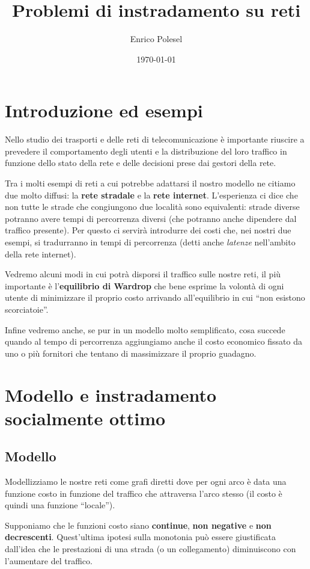 \documentclass[a4paper]{article}
\title{Problemi di instradamento su reti}
\date{\today}
\author{Enrico Polesel}
\theoremstyle{plain}
\theoremstyle{definition}
\theoremstyle{remark}
\begin{document}
\maketitle

\section{Introduzione ed esempi}

Nello studio dei trasporti e delle reti di telecomunicazione è
importante riuscire a prevedere il comportamento degli utenti e la
distribuzione del loro traffico in funzione dello stato della rete e
delle decisioni prese dai gestori della rete.

Tra i molti esempi di reti a cui potrebbe adattarsi il nostro modello
ne citiamo due molto diffusi: la \textbf{rete stradale} e la
\textbf{rete internet}. L'esperienza ci dice che non tutte le strade
che congiungono due località sono equivalenti: strade diverse potranno
avere tempi di percorrenza diversi (che potranno anche dipendere dal
traffico presente). Per questo ci servirà introdurre dei costi che,
nei nostri due esempi, si tradurranno in tempi di percorrenza (detti
anche \textit{latenze} nell'ambito della rete internet).

Vedremo alcuni modi in cui potrà disporsi il traffico sulle nostre
reti, il più importante è l'\textbf{equilibrio di Wardrop} che bene
esprime la volontà di ogni utente di minimizzare il proprio costo
arrivando all'equilibrio in cui ``non esistono scorciatoie''.

Infine vedremo anche, se pur in un modello molto semplificato, cosa
succede quando al tempo di percorrenza aggiungiamo anche il costo
economico fissato da uno o più fornitori che tentano di massimizzare
il proprio guadagno.

\section{Modello e instradamento socialmente ottimo}

\subsection{Modello}

Modellizziamo le nostre reti come grafi diretti dove per ogni arco è
data una funzione costo in funzione del traffico che attraversa l'arco
stesso (il costo è quindi una funzione ``locale'').

Supponiamo che le funzioni costo siano \textbf{continue}, \textbf{non
  negative} e \textbf{non decrescenti}. Quest'ultima ipotesi sulla
monotonia può essere giustificata dall'idea che le prestazioni di una
strada (o un collegamento) diminuiscono con l'aumentare del traffico.
\end{document}
